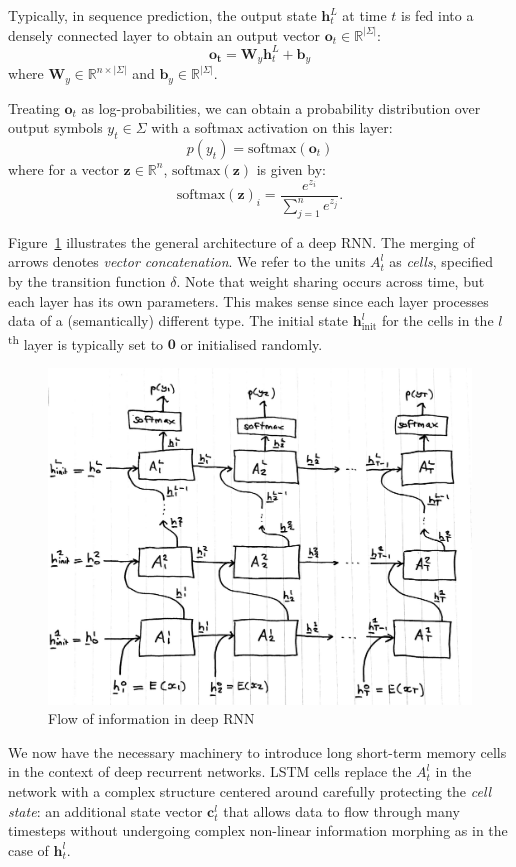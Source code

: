 \documentclass[12pt,a4paper,twoside,openright]{report}
\newcommand{\vect}[1]{\boldsymbol{\mathbf{#1}}}
\begin{document}
Typically, in sequence prediction, the output state $\vect{h}_t^L$ at time $t$
is fed into a densely connected layer to obtain an output vector $\vect{o}_t \in
\mathbb{R}^{|\Sigma|}$:
$$ \vect{o_t} = \vect{W}_y \vect{h}_t^L + \vect{b}_y $$
where $\vect{W}_y \in \mathbb{R}^{n \times |\Sigma|}$ and $\vect{b}_y \in
\mathbb{R}^{|\Sigma|}$. 

Treating $\vect{o}_t$ as log-probabilities, we can obtain a probability
distribution over output symbols $y_t \in \Sigma$ with a softmax activation on
this layer:
$$ p(y_t) = \mathrm{softmax}(\vect{o}_t) $$
where for a vector $\vect{z} \in \mathbb{R}^n$, $\mathrm{softmax}(\vect{z})$ is
given by:
$$ \mathrm{softmax}(\vect{z})_i = \frac{ e^{z_i} }{ \sum_{j = 1}^n e^{z_j} }. $$

Figure~\ref{fig:deep-rnn-arch} illustrates the general architecture of a deep
RNN. The merging of arrows denotes \emph{vector concatenation}. We refer to the
units $A_t^l$ as \emph{cells}, specified by the transition function $\delta$.
Note that weight sharing occurs across time, but each layer has its own
parameters. This makes sense since each layer processes data of a (semantically)
different type. The initial state $\vect{h}_{\mathrm{init}}^l$ for the cells in
the $l$\textsuperscript{th} layer is typically set to $\vect{0}$ or initialised
randomly. 

\begin{figure}[H]
\centering
\includegraphics[width=350pt]{figs/deep_rnn_tmp.jpg}
\caption{Flow of information in deep RNN}
\label{fig:deep-rnn-arch}
\end{figure}

We now have the necessary machinery to introduce long short-term memory cells in
the context of deep recurrent networks. LSTM cells replace the $A_t^l$ in the
network with a complex structure centered around carefully protecting the
\emph{cell state}: an additional state vector $\vect{c}_t^l$ that allows data to
flow through many timesteps without undergoing complex non-linear information
morphing as in the case of $\vect{h}_t^l$.
\end{document}
